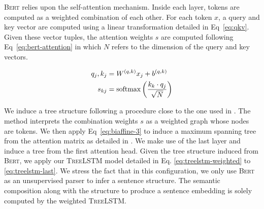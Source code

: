 \textsc{Bert} relies upon the self-attention mechanism. Inside each layer, tokens are computed as a weighted combination of each other. For each token $x$, a query and key vector are computed using a linear transformation detailed in Eq~\ref{eq:qkv}. Given these vector tuples, the attention weights $s$ are computed following Eq~\ref{eq:bert-attention} in which $N$ refers to the dimension of the query and key vectors.

\begin{align}
    q_j, k_j &= W^{(q, k)} x_j + b^{(q, k)} \label{eq:qkv}\\
    s_{kj} &= \operatorname{softmax}\left(\frac{k_{k} \cdot q_{j}}{\sqrt{N}}\right) \label{eq:bert-attention}
\end{align}

We induce a tree structure following a procedure close to the one used in \textcite{ravishankar_21}. The method interprets the combination weights $s$ as a weighted graph whose nodes are tokens. We then apply Eq~\ref{eq:biaffine-3} to induce a maximum spanning tree from the attention matrix as detailed in . We make use of the last layer and induce a tree from the first attention head. Given the tree structure induced from \textsc{Bert}, we apply our \textsc{TreeLSTM} model detailed in Eq. \ref{eq:treelstm-weighted} to \ref{eq:treelstm-last}. We stress the fact that in this configuration, we only use \textsc{Bert} as an unsupervised parser to infer a sentence structure. The semantic composition along with the structure to produce a sentence embedding is solely computed by the weighted \textsc{TreeLSTM}.

